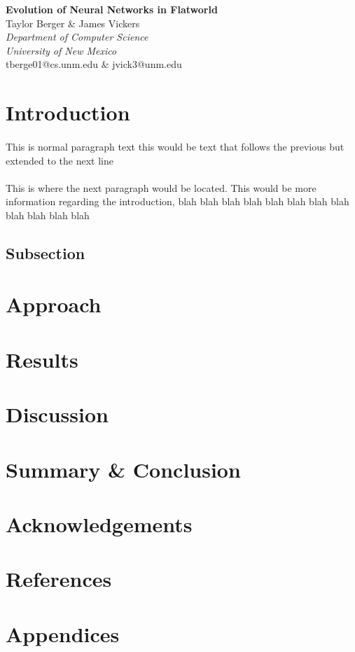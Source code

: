 \documentclass[12pt]{article}
\begin{document}
\begin{center}
\textbf{\huge{Evolution of Neural Networks in Flatworld}}\\
\vspace{5mm}
\Large{Taylor Berger \& James Vickers}\\
\vspace{3mm}
\Large{\emph{Department of Computer Science}}\\
\Large{\emph{University of New Mexico}}\\
\vspace{3mm}
\normalsize{tberge01@cs.unm.edu \& jvick3@unm.edu}\\
\end{center}

\section{Introduction}
\paragraph{} This is normal paragraph text this would be text that follows the previous but extended to the next line
\paragraph{} This is where the next paragraph would be located. This would be more information regarding the introduction, blah blah blah blah blah blah blah blah blah blah blah blah
\subsection{Subsection}
\section{Approach}
\section{Results}
\section{Discussion}
\section{Summary \& Conclusion}
\section{Acknowledgements}
\section{References}
\section{Appendices}
\end{document}
